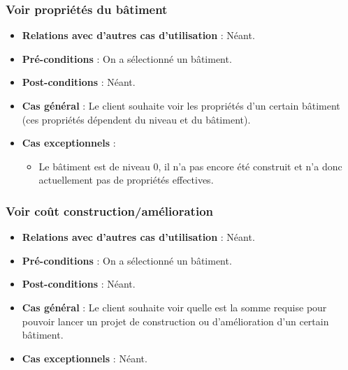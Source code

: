 \documentclass[a4paper,titlepage]{scrreprt}
\begin{document}
    \subsubsection{Voir propriétés du bâtiment}
      \begin{itemize}
        \item \textbf{Relations avec d'autres cas d'utilisation}  : Néant.
        \item \textbf{Pré-conditions} : On a sélectionné un bâtiment.
        \item \textbf{Post-conditions} : Néant.
        \item \textbf{Cas général} : Le client souhaite voir les propriétés d’un certain bâtiment (ces propriétés dépendent du niveau et du bâtiment).
        \item \textbf{Cas exceptionnels} :
          \begin{itemize}
            \item Le bâtiment est de niveau 0, il n'a pas encore été construit et n'a donc actuellement pas de propriétés effectives.
          \end{itemize}
      \end{itemize}
    \subsubsection{Voir coût construction/amélioration}
      \begin{itemize}
        \item \textbf{Relations avec d'autres cas d'utilisation}  : Néant.
        \item \textbf{Pré-conditions} : On a sélectionné un bâtiment.
        \item \textbf{Post-conditions} : Néant.
        \item \textbf{Cas général} : Le client souhaite voir quelle est la somme requise pour pouvoir lancer un projet de construction ou d’amélioration d’un certain bâtiment.
        \item \textbf{Cas exceptionnels} : Néant.
      \end{itemize}
\end{document}
